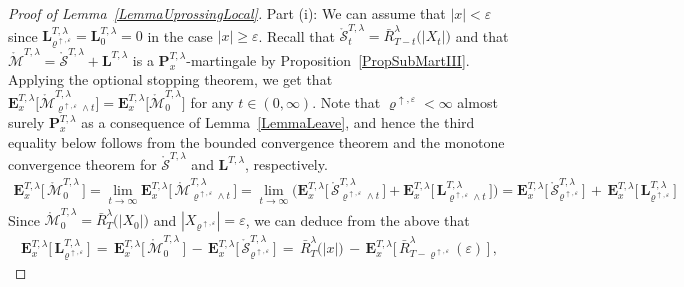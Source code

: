 \documentclass[10pt]{article}
\numberwithin{equation}{section}
\theoremstyle{definition}
\begin{document}
\begin{proof}[Proof of Lemma~\ref{LemmaUprossingLocal}] Part (i): We can assume that $|x|  < \varepsilon$ since $\mathbf{L}_{\varrho^{\uparrow, \varepsilon} }^{T,\lambda} =\mathbf{L}_{0 }^{T,\lambda}=0$ in the case $|x|  \geq \varepsilon$.  Recall that $\mathring{\mathcal{S}}_t^{T,\lambda}=\bar{R}_{T-t}^{\lambda}\big(|X_{t}|\big)$  and that $\mathring{\mathcal{M}}^{T,\lambda}=\mathring{\mathcal{S}}^{T,\lambda}+ \mathbf{L}^{T,\lambda}$ is a $\mathbf{P}^{T,\lambda}_{x}$-martingale by Proposition~\ref{PropSubMartIII}.  Applying the optional stopping theorem, we get that $\mathbf{E}^{T,\lambda}_{x}\big[\mathring{\mathcal{M}}^{T,\lambda}_{\varrho^{\uparrow, \varepsilon}\wedge t} \big]=\mathbf{E}^{T,\lambda}_{x}\big[\mathring{\mathcal{M}}^{T,\lambda}_{0} \big]$ for any $t\in (0,\infty)$.  Note that $  \varrho^{\uparrow, \varepsilon}<\infty $ almost surely $\mathbf{P}^{T,\lambda}_{x}$ as  a consequence of Lemma~\ref{LemmaLeave}, and hence the third equality below follows from the bounded convergence theorem and the monotone convergence theorem  for $\mathring{\mathcal{S}}^{T,\lambda}$ and $\mathbf{L}^{T,\lambda}$, respectively.
\begin{align*}
\mathbf{E}^{T,\lambda}_{x}\Big[\,\mathring{\mathcal{M}}^{T,\lambda}_{0}\, \Big]=\lim_{t\rightarrow \infty} \mathbf{E}^{T,\lambda}_{x}\Big[\,\mathring{\mathcal{M}}^{T,\lambda}_{\varrho^{\uparrow, \varepsilon}\wedge t} \,\Big]=\lim_{t\rightarrow \infty} \Big(\mathbf{E}^{T,\lambda}_{x}\Big[\,\mathring{\mathcal{S}}^{T,\lambda}_{\varrho^{\uparrow, \varepsilon}\wedge t}\, \Big]  + \mathbf{E}^{T,\lambda}_{x}\Big[\,\mathbf{L}^{T,\lambda}_{\varrho^{\uparrow, \varepsilon}\wedge t} \,\Big]  \Big)=\mathbf{E}^{T,\lambda}_{x}\Big[\,\mathring{\mathcal{S}}^{T,\lambda}_{\varrho^{\uparrow, \varepsilon}} \,\Big]  \,+\,\mathbf{E}^{T,\lambda}_{x}\Big[\,\mathbf{L}^{T,\lambda}_{\varrho^{\uparrow, \varepsilon}} \,\Big]  
\end{align*}
Since $\mathring{\mathcal{M}}^{T,\lambda}_{0}= \bar{R}_{T}^{\lambda}\big(|X_{0}|\big)  $ and  $|X_{\varrho^{\uparrow, \varepsilon}}|=\varepsilon$, we can deduce from the above that
\begin{align}\label{Tin}
 \mathbf{E}^{T,\lambda}_{x}\Big[\,\mathbf{L}^{T,\lambda}_{\varrho^{\uparrow, \varepsilon} }\,\Big] \,=\,    \mathbf{E}^{T,\lambda}_{x}\Big[\,\mathring{\mathcal{M}}^{T,\lambda}_{0} \,\Big]\,-\,\mathbf{E}^{T,\lambda}_{x}\Big[\,\mathring{\mathcal{S}}^{T,\lambda}_{\varrho^{\uparrow, \varepsilon} }\,\Big] \,=\,  \bar{R}_{T}^{\lambda}\big(|x|\big) \,-\,\mathbf{E}^{T,\lambda}_{x}\Big[ \,\bar{R}_{T-\varrho^{\uparrow, \varepsilon}}^{\lambda}(\varepsilon)\,\Big]  \,,

\end{align}
\end{proof}
\end{document}
